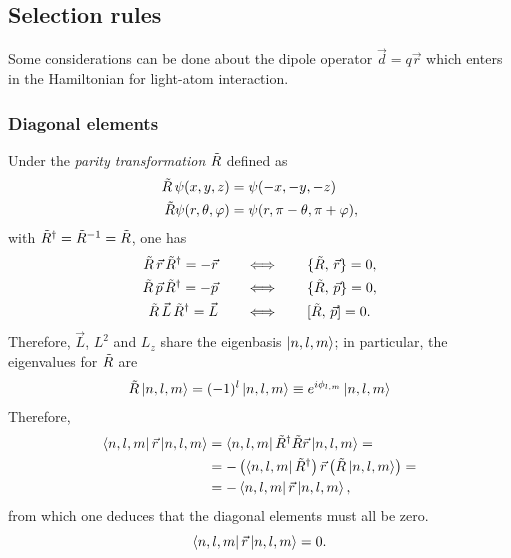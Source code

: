 \subsection{Selection rules}

Some considerations can be done about the dipole operator $\vec{d} = q \vec{r}$ which enters in the Hamiltonian for light-atom interaction. 

\subsubsection{Diagonal elements}
Under the \textit{parity transformation} $\Tilde{R}$ defined as
\begin{align*}
    \Tilde{R}\,\psi(x,y,z)&=\psi(-x, -y, -z) \\
    \Tilde{R}\psi(r, \theta, \varphi)&=\psi(r, \pi-\theta, \pi+\varphi),
\end{align*}
with $\Tilde{R}^\dagger=\Tilde{R}^{-1}=\Tilde{R}$, one has
\begin{align*}
    \Tilde{R}\, \Vec{r} \, \Tilde{R}^\dagger =-\Vec{r} \qquad &\Longleftrightarrow \qquad \{ \Tilde{R},\,  \vec{r} \} = 0, \\
    \Tilde{R}\, \Vec{p} \, \Tilde{R}^\dagger =-\Vec{p} \qquad &\Longleftrightarrow \qquad \{ \Tilde{R}, \, \vec{p} \} = 0, \\
     \Tilde{R}\, \Vec{L} \, \Tilde{R}^\dagger =\vec{L} \qquad &\Longleftrightarrow \qquad [ \Tilde{R}, \, \vec{p} ] = 0. \\
\end{align*}
Therefore, $\vec{L}$, $L^2$ and $L_z$ share the eigenbasis $\ket{n,l,m}$; in particular, the eigenvalues for $\Tilde{R}$ are 
\begin{align}
    \Tilde{R}\ket{n,l,m} =  (-1)^l \ket{n,l,m} \equiv e^{i \phi_{l,m}} \ket{n,l,m}
\end{align}
Therefore,
\begin{align*}
    \bra{n,l,m}\Vec{r}\ket{n,l,m} &= \bra{n,l,m} \Tilde{R}^\dagger \Tilde{R}  \Vec{r} \ket{n,l,m} = \\
    &= - \left( \bra{n,l,m} \tilde{R}^\dagger \right) \vec{r} \left( \tilde{R} \ket{n,l,m}\right) =\\
    &= -\bra{n,l,m} \vec{r} \ket{n,l,m}, 
\end{align*}
from which one deduces that the diagonal elements must all be zero.
\begin{equation*}
    \bra{n,l,m}{\Vec{r}}\ket{n,l,m}=0.
\end{equation*}

